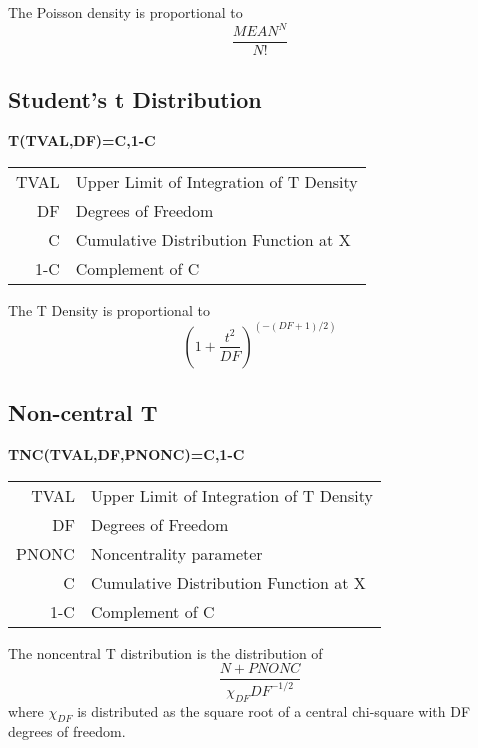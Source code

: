 \documentclass[12pt,dvips]{article}
\newcommand{\mysubsection}[1]
    {\color{green}\subsection{#1}\color{black}}
\begin{document}
     The Poisson density is proportional to 
\[ \frac{MEAN^N}{N!}  \]
     
     
\mysubsection{Student's t Distribution}

{\bf \centering T(TVAL,DF)=C,1-C\\}

\begin{center}
\begin{tabular}{rl}
        TVAL & Upper Limit of Integration of T Density\\
        DF   & Degrees of Freedom\\
        C    & Cumulative Distribution Function at X\\
        1-C  & Complement of C\\
\end{tabular}
\end{center}

     The T Density is proportional to
\[     (1+\frac{t^2}{DF})^{(-(DF+1)/2)} \]

\mysubsection{Non-central T}

{\bf \centering TNC(TVAL,DF,PNONC)=C,1-C}

\begin{center}
\begin{tabular}{rl}
        TVAL & Upper Limit of Integration of T Density\\
        DF   & Degrees of Freedom\\
        PNONC&Noncentrality parameter\\
        C    & Cumulative Distribution Function at X\\
        1-C  & Complement of C\\
\end{tabular}
\end{center}

The noncentral T distribution is the distribution of
\[ \frac{N+PNONC}{\chi_{DF} DF^{-1/2}} \]
where $\chi_{DF}$ is distributed as the square root of 
a central chi-square with DF degrees of freedom.
\end{document}
